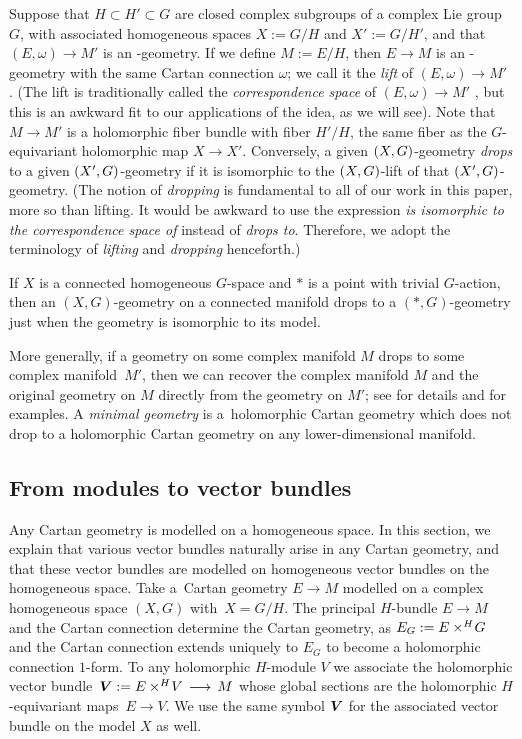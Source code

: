 \documentclass[11pt]{article}
\numberwithin{equation}{section}
\numberwithin{equation}{section}
\begin{document}
Suppose that $H \subset H' \subset G$ are closed complex subgroups of a complex Lie group $G$, with associated homogeneous
spaces $X := G/H$ and $X' := G/H'$, and that $(E, \omega) \to M'$ is an -geometry.
If we define $M := E/H$, then $E \to M$ is an -geometry with the same Cartan connection $\omega$;
we call it the \emph{lift} of $(E, \omega) \to M'$ \cite[Section~1.5.13]{Cap/Slovak:2009}.
(The lift is traditionally called the \emph{correspondence space} of $(E, \omega) \to M'$ \cite[Section~1.5.13]{Cap/Slovak:2009}, but this is an awkward fit to our applications of the idea, as we will see).
Note that $M \to M'$ is a holomorphic fiber bundle
with fiber $H'/H$, the same fiber as the $G$-equivariant holomorphic map $X \to X'$.
Conversely, a given $\pr{X, G}$-geometry \emph{drops} to a given $\pr{X',G}$-geometry if it is isomorphic to the $\pr{X, G}$-lift
of that $\pr{X', G}$-geometry.
(The notion of \emph{dropping} is fundamental to all of our work in this paper, more so than lifting. It would be awkward to use the expression \emph{is isomorphic to the correspondence space of} instead of \emph{drops to}.
Therefore, we adopt the terminology of \emph{lifting} and \emph{dropping} henceforth.)

\begin{Example}
If $X$ is a connected homogeneous $G$-space and $*$ is a point with trivial $G$-action, then an $(X, G)$-geometry on a
connected manifold drops to a $(*, G)$-geometry just when the geometry is isomorphic to its model.
\end{Example}

More generally, if a geometry on some complex manifold $M$ drops to some complex manifold~$M'$, then we can recover the complex manifold $M$ and the original geometry on $M$ directly from the geometry on $M'$; see \cite{Biswas.McKay:2016} for details and \cite{McKay2011b} for examples.
A \emph{minimal geometry} is a~holomorphic Cartan geometry which does not drop to a holomorphic Cartan geometry on any lower-dimensional manifold.

\subsection{From modules to vector bundles}
Any Cartan geometry is modelled on a homogeneous space.
In this section, we explain that various vector bundles naturally arise in any Cartan geometry, and that these vector bundles are modelled on homogeneous vector
bundles \cite[Section 10]{mckay2023introduction} on the homogeneous space.
Take a~Cartan geometry $E \to M$ modelled on a complex homogeneous space $(X, G)$ with~${X = G/H}$.
The principal $H$-bundle $E \to M$ and the Cartan connection determine the Cartan geometry,
as $E_G := \prodquot{E}{G}{H}$ and the Cartan connection extends uniquely to $E_G$ to become a holomorphic connection $1$-form.
To any holomorphic $H$-module $V$ we associate the holomorphic vector bundle~$\vb{V} := \prodquot{E}{V}{H} \to M$
whose global sections are the holomorphic $H$-equivariant maps~${E \to V}$.
We use the same symbol $\vb{V}$ for the associated vector bundle on the model $X$ as well.
\end{document}
